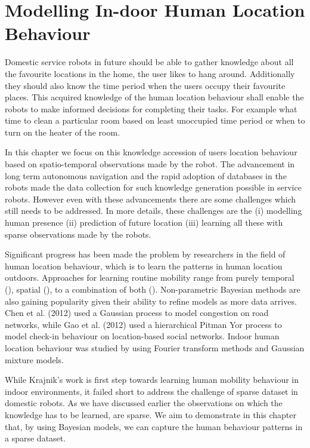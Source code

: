 

\chapter{Modelling In-door Human Location Behaviour }

Domestic service robots in future should be able to gather knowledge about all the favourite locations in the home, the user likes to hang around. Additionally they should also know the time period when the users occupy their favourite places. This acquired knowledge of the human location behaviour shall enable the robots to make informed decisions for completing their tasks. For example what time to clean a particular room based  on least unoccupied time period or when to turn on the heater of the room. 

In this chapter we focus on this knowledge accession of users location behaviour based on spatio-temporal observations made by the robot. The advancement in long term autonomous navigation  and the rapid adoption of databases in the robots  made the data collection for such knowledge generation possible in service robots. However even with these advancements there are some challenges which still needs to be addressed.  In more details, these challenges are the (i) modelling human presence (ii) prediction of future location (iii) learning all these with sparse observations made by the robots. 

Significant progress has been made the problem by researchers in the field of human location behaviour, which is to learn the patterns in human location outdoors. Approaches for learning routine mobility  range from purely temporal (\cite{mcinerney2013modelling, scellato2011nextplace}), spatial (\cite{gao2012exploring,song2006evaluating}), to a combination  of  both  (\cite{eagle2009eigenbehaviors}). Non-parametric Bayesian methods are also gaining popularity given their ability to refine models as more data arrives. Chen et al. (2012) used a Gaussian process to model congestion on road networks, while Gao et al. (2012) used a hierarchical Pitman Yor process to model check-in behaviour on location-based social networks. Indoor human location behaviour was studied by \cite{krajnik_wheres_2015} using Fourier transform methods and Gaussian mixture models. 

While Krajnik's  work is first step towards learning human mobility behaviour in indoor environments, it failed short to address the challenge of sparse dataset in domestic robots. As we have discussed earlier the observations on which the knowledge has to be learned, are sparse. We aim to demonstrate in this chapter that, by using Bayesian models, we can capture the human behaviour patterns in a sparse dataset.

